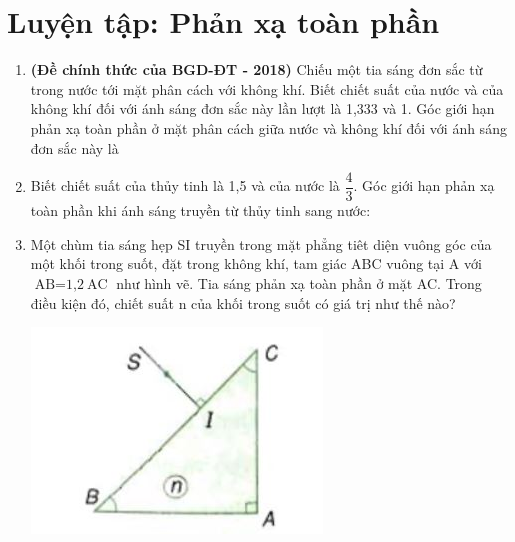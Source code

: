 \chapter{Luyện tập: Phản xạ toàn phần}
\begin{enumerate}
	\item{\textbf{(Đề chính thức của BGD-ĐT - 2018)} Chiếu một tia sáng đơn sắc từ trong nước tới mặt phân cách với không khí. Biết chiết suất của nước và của không khí đối với ánh sáng đơn sắc này lần lượt là 1,333 và 1. Góc giới hạn phản xạ toàn phần ở mặt phân cách giữa nước và không khí đối với ánh sáng đơn sắc này là 
}	
	\item{Biết chiết suất của thủy tinh là 1,5 và của nước là $\dfrac{4}{3}$. Góc giới hạn phản xạ toàn phần khi ánh sáng truyền từ thủy tinh sang nước:
}	
	\item{Một chùm tia sáng hẹp SI truyền trong mặt phẳng tiêt diện vuông góc của một khối trong suốt, đặt trong không khí, tam giác ABC vuông tại A với $\text{AB} = \text{1,2}\ \text{AC}$ như hình vẽ. Tia sáng phản xạ toàn phần ở mặt AC. Trong điều kiện đó, chiết suất n của khối trong suốt có giá trị như thế nào?
		\begin{center}
			\includegraphics[scale=0.6]{../figs/VN11-PH-35-P-023-1-1.JPG}
		\end{center}
}
\end{enumerate}
